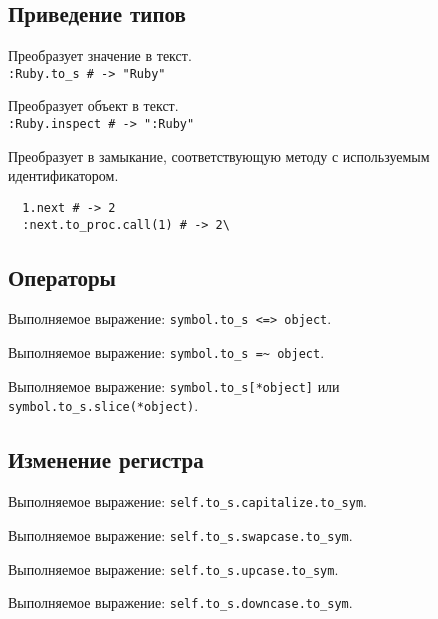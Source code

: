 \subsection*{Приведение типов}

\begin{methodlist}
  Преобразует значение в текст.
  \\\verb!:Ruby.to_s # -> "Ruby"!

  Преобразует объект в текст.
  \\\verb!:Ruby.inspect # -> ":Ruby"!


  Преобразует в замыкание, соответствующую методу с используемым идентификатором.
  \begin{verbatim}
  1.next # -> 2
  :next.to_proc.call(1) # -> 2\
  \end{verbatim}  
\end{methodlist}

\subsection*{Операторы}

\begin{methodlist}
  Выполняемое выражение: \verb!symbol.to_s <=> object!.

  Выполняемое выражение: \verb!symbol.to_s =~ object!.

  Выполняемое выражение: \verb!symbol.to_s[*object]! или \verb!symbol.to_s.slice(*object)!.
\end{methodlist}

\subsection*{Изменение регистра}

\begin{methodlist}
  Выполняемое выражение: \verb!self.to_s.capitalize.to_sym!.

  Выполняемое выражение: \verb!self.to_s.swapcase.to_sym!.

  Выполняемое выражение: \verb!self.to_s.upcase.to_sym!.

  Выполняемое выражение: \verb!self.to_s.downcase.to_sym!.
\end{methodlist}

